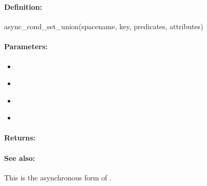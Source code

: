 \pagebreak
\subsubsection{}
\label{api:ruby:async_cond_set_union}


\paragraph{Definition:}
\begin{rubycode}
async_cond_set_union(spacename, key, predicates, attributes)
\end{rubycode}

\paragraph{Parameters:}
\begin{itemize}[noitemsep]
\item {}\\

\item {}\\

\item {}\\

\item {}\\

\end{itemize}

\paragraph{Returns:}


\paragraph{See also:}  This is the asynchronous form of .

\pagebreak
\subsubsection{}
\label{api:ruby:group_set_union}



